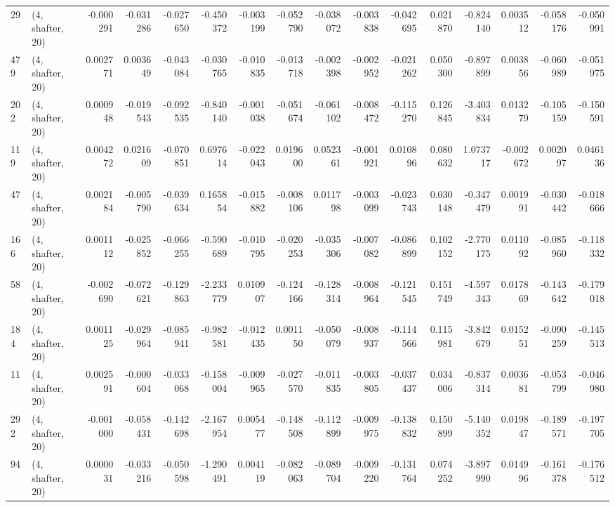 \begin{tabular}{llrrrrrrrrrrrrrr}
29  &  (4, shafter, 20) &  -0.000291 & -0.031286 & -0.027650 &  -0.450372 & -0.003199 &  -0.052790 & -0.038072 & -0.003838 & -0.042695 &  0.021870 &    -0.824140 &   0.003512 &  -0.058176 &  -0.050991 \\
479 &  (4, shafter, 20) &   0.002771 &  0.003649 & -0.043084 &  -0.030765 & -0.010835 &  -0.013718 & -0.002398 & -0.002952 & -0.021262 &  0.050300 &    -0.897899 &   0.003856 &  -0.060989 &  -0.051975 \\
202 &  (4, shafter, 20) &   0.000948 & -0.019543 & -0.092535 &  -0.840140 & -0.001038 &  -0.051674 & -0.061102 & -0.008472 & -0.115270 &  0.126845 &    -3.403834 &   0.013279 &  -0.105159 &  -0.150591 \\
119 &  (4, shafter, 20) &   0.004272 &  0.021609 & -0.070851 &   0.697614 & -0.022043 &   0.019600 &  0.052361 & -0.001921 &  0.010896 &  0.080632 &     1.073717 &  -0.002672 &   0.002097 &   0.046136 \\
47  &  (4, shafter, 20) &   0.002184 & -0.005790 & -0.039634 &   0.165854 & -0.015882 &  -0.008106 &  0.011798 & -0.003099 & -0.023743 &  0.030148 &    -0.347479 &   0.001991 &  -0.030442 &  -0.018666 \\
166 &  (4, shafter, 20) &   0.001112 & -0.025852 & -0.066255 &  -0.590689 & -0.010795 &  -0.020253 & -0.035306 & -0.007082 & -0.086899 &  0.102152 &    -2.770175 &   0.011092 &  -0.085960 &  -0.118332 \\
58  &  (4, shafter, 20) &  -0.002690 & -0.072621 & -0.129863 &  -2.233779 &  0.010907 &  -0.124166 & -0.128314 & -0.008964 & -0.121545 &  0.151749 &    -4.597343 &   0.017869 &  -0.143642 &  -0.179018 \\
184 &  (4, shafter, 20) &   0.001125 & -0.029964 & -0.085941 &  -0.982581 & -0.012435 &   0.001150 & -0.050079 & -0.008937 & -0.114566 &  0.115981 &    -3.842679 &   0.015251 &  -0.090259 &  -0.145513 \\
11  &  (4, shafter, 20) &   0.002591 & -0.000604 & -0.033068 &  -0.158004 & -0.009965 &  -0.027570 & -0.011835 & -0.003805 & -0.037437 &  0.034006 &    -0.837314 &   0.003681 &  -0.053799 &  -0.046980 \\
292 &  (4, shafter, 20) &  -0.001000 & -0.058431 & -0.142698 &  -2.167954 &  0.005477 &  -0.148508 & -0.112899 & -0.009975 & -0.138832 &  0.150899 &    -5.140352 &   0.019847 &  -0.189571 &  -0.197705 \\
94  &  (4, shafter, 20) &   0.000031 & -0.033216 & -0.050598 &  -1.290491 &  0.004119 &  -0.082063 & -0.089704 & -0.009220 & -0.131764 &  0.074252 &    -3.897990 &   0.014996 &  -0.161378 &  -0.176512 \\

\end{tabular}
